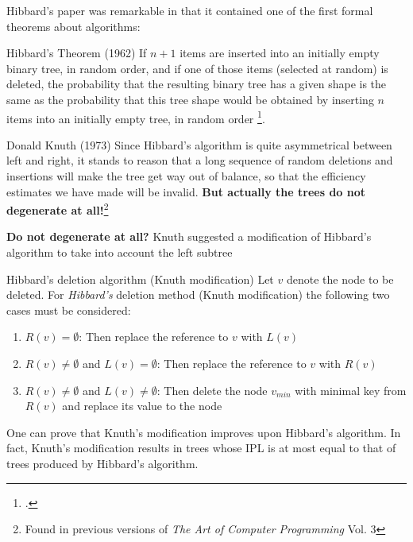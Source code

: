 \documentclass{beamer}
\begin{document}
\begin{frame}
    Hibbard’s paper was remarkable in that it contained one of the first formal theorems about algorithms:
    \pause
    \begin{block}{Hibbard's Theorem (1962)}
        If $n + 1$ items are inserted into an initially empty binary tree, in random order, and if one of those items (selected at random) is deleted, the probability that the resulting binary tree has a given shape is the same as the probability that this tree shape would be obtained by inserting $n$ items into an initially empty tree, in random order \footcite{hibbard1962}.
    \end{block}
\end{frame}

\begin{frame}
    \begin{block}{Donald Knuth (1973)}
        Since Hibbard's algorithm is quite asymmetrical between left and right, it stands to reason that a long sequence of random deletions and insertions will make the tree get way out of balance, so that the efficiency estimates we have made will be invalid. \textbf{But actually the trees do not degenerate at all!}\footnote{Found in previous versions of \textit{The Art of Computer Programming} Vol. 3}
    \end{block}
\end{frame}

\begin{frame}
    \textbf{Do not degenerate at all?}
    \pause
    Knuth suggested a modification of Hibbard's algorithm to take into account the left subtree
    \begin{block}{Hibbard's deletion algorithm (Knuth modification)}
        Let $v$ denote the node to be deleted. For \textit{Hibbard's} deletion method (Knuth modification) the following two cases must be considered:
        \begin{enumerate}
            \item $R(v) = \emptyset$: Then replace the reference to $v$ with $L(v)$
            \item $R(v) \neq \emptyset$ and $L(v) = \emptyset$: Then replace the reference to $v$ with $R(v)$
            \item $R(v) \neq \emptyset$ and $L(v) \neq \emptyset$: Then delete the node $v_{min}$ with minimal key from $R(v)$ and replace its value to the node
        \end{enumerate}
    \end{block}
    \pause
    One can prove that Knuth's modification improves upon Hibbard's algorithm. In fact, Knuth's modification results in trees whose IPL is at most equal to that of trees produced by Hibbard's algorithm.
\end{frame}
\end{document}
